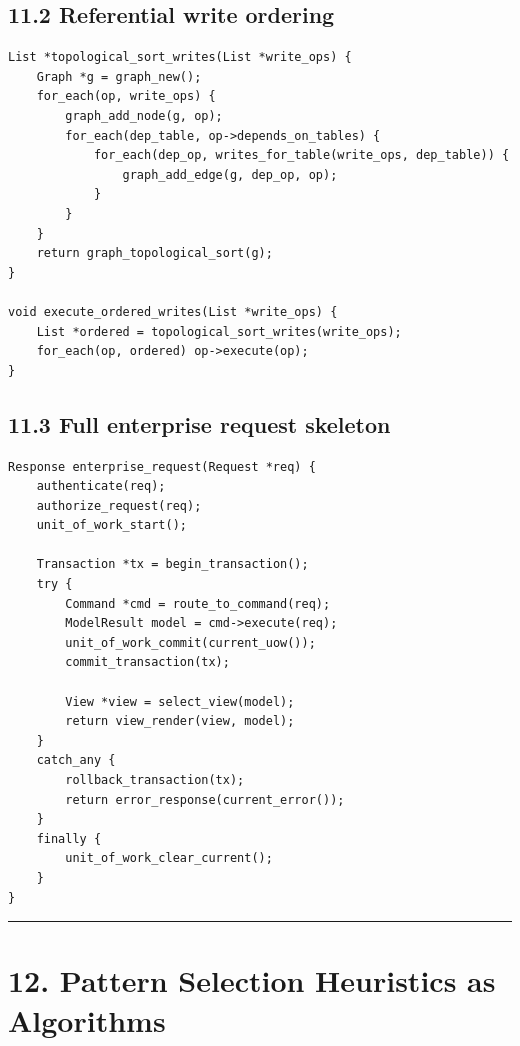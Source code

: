 \documentclass[11pt]{article}
\begin{document}
\subsection{11.2 Referential write
ordering}\label{referential-write-ordering}

\begin{verbatim}
List *topological_sort_writes(List *write_ops) {
    Graph *g = graph_new();
    for_each(op, write_ops) {
        graph_add_node(g, op);
        for_each(dep_table, op->depends_on_tables) {
            for_each(dep_op, writes_for_table(write_ops, dep_table)) {
                graph_add_edge(g, dep_op, op);
            }
        }
    }
    return graph_topological_sort(g);
}

void execute_ordered_writes(List *write_ops) {
    List *ordered = topological_sort_writes(write_ops);
    for_each(op, ordered) op->execute(op);
}
\end{verbatim}

\subsection{11.3 Full enterprise request
skeleton}\label{full-enterprise-request-skeleton}

\begin{verbatim}
Response enterprise_request(Request *req) {
    authenticate(req);
    authorize_request(req);
    unit_of_work_start();

    Transaction *tx = begin_transaction();
    try {
        Command *cmd = route_to_command(req);
        ModelResult model = cmd->execute(req);
        unit_of_work_commit(current_uow());
        commit_transaction(tx);

        View *view = select_view(model);
        return view_render(view, model);
    }
    catch_any {
        rollback_transaction(tx);
        return error_response(current_error());
    }
    finally {
        unit_of_work_clear_current();
    }
}
\end{verbatim}

\begin{center}\rule{0.5\linewidth}{0.5pt}\end{center}

\section{12. Pattern Selection Heuristics as
Algorithms}\label{pattern-selection-heuristics-as-algorithms}
\end{document}

